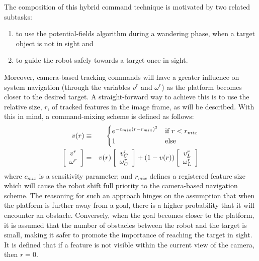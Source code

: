 			The composition of this hybrid command technique is motivated by two related subtasks: 
				\begin{enumerate}
				\item to use the potential-fields algorithm during a wandering phase, when a target object is not in sight and
				\item to guide the robot safely towards a target once in sight.
				\end{enumerate}
			Moreover, camera-based tracking commands will have a greater influence on system navigation (through the variables $v^{r}$ and $\omega^{r}$) as the platform becomes closer to the desired target. A straight-forward way to achieve this is to use the relative size, $r$, of tracked features in the image frame, as will be described. With this in mind, a command-mixing scheme is defined as follows:
			\begin{eqnarray}
				v(r) &\equiv&
				\begin{cases}
				e^{ -c_{mix} \left( r - r_{mix}\right)^{2} } 	& \text{if } r < r_{mix}	\\
				1											& \text{else}
				\end{cases}
								\nonumber \\
						\left[\begin{array}{c} v^{r} 	\\ \omega^{r} 		\end{array} \right] &=& 	
				v(r)	\left[\begin{array}{c} v^{r}_{C}\\ \omega^{r}_{C} 	\end{array} \right] + 
				(1-v(r))\left[\begin{array}{c} v^{r}_{L}\\ \omega^{r}_{L} 	\end{array} \right] 
			\end{eqnarray}
			where $c_{mix}$ is a sensitivity parameter; and $r_{mix}$ defines a registered feature size which will cause the robot shift full priority to the camera-based navigation scheme. The reasoning for such an approach hinges on the assumption that when the platform is further away from a goal, there is a higher probability that it will encounter an obstacle. Conversely, when the goal becomes closer to the platform, it is assumed that the number of obstacles between the robot and the target is small, making it safer to promote the importance of reaching the target in sight. It is defined that if a feature is not visible within the current view of the camera, then $r=0$.

